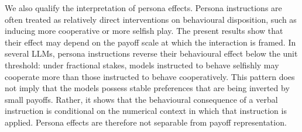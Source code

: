 \documentclass[11pt,a4paper]{article}
\begin{document}


We also qualify the interpretation of persona effects. Persona instructions are often treated as relatively direct interventions on behavioural disposition, such as inducing more cooperative or more selfish play. The present results show that their effect may depend on the payoff scale at which the interaction is framed. In several LLMs, persona instructions reverse their behavioural effect below the unit threshold: under fractional stakes, models instructed to behave selfishly may cooperate more than those instructed to behave cooperatively. This pattern does not imply that the models possess stable preferences that are being inverted by small payoffs. Rather, it shows that the behavioural consequence of a verbal instruction is conditional on the numerical context in which that instruction is applied. Persona effects are therefore not separable from payoff representation.
\end{document}
